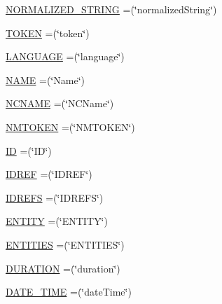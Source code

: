 \begin{DoxyCompactItemize}
\item 
\hyperlink{enumorg_1_1semanticweb_1_1owlapi_1_1vocab_1_1_x_s_d_vocabulary_ae575de1015474d1af2b4d68b3b860fc9}{N\-O\-R\-M\-A\-L\-I\-Z\-E\-D\-\_\-\-S\-T\-R\-I\-N\-G} =(\char`\"{}normalized\-String\char`\"{})
\item 
\hyperlink{enumorg_1_1semanticweb_1_1owlapi_1_1vocab_1_1_x_s_d_vocabulary_ab7d2aaa2bcc22a2cf82afee863ff6a35}{T\-O\-K\-E\-N} =(\char`\"{}token\char`\"{})
\item 
\hyperlink{enumorg_1_1semanticweb_1_1owlapi_1_1vocab_1_1_x_s_d_vocabulary_a97caa0a9ecc52d652717cc24430c829c}{L\-A\-N\-G\-U\-A\-G\-E} =(\char`\"{}language\char`\"{})
\item 
\hyperlink{enumorg_1_1semanticweb_1_1owlapi_1_1vocab_1_1_x_s_d_vocabulary_a34846eda7ef12a87485e47e445bee899}{N\-A\-M\-E} =(\char`\"{}Name\char`\"{})
\item 
\hyperlink{enumorg_1_1semanticweb_1_1owlapi_1_1vocab_1_1_x_s_d_vocabulary_a809c4d39248eaee8d204aa51e4c04f45}{N\-C\-N\-A\-M\-E} =(\char`\"{}N\-C\-Name\char`\"{})
\item 
\hyperlink{enumorg_1_1semanticweb_1_1owlapi_1_1vocab_1_1_x_s_d_vocabulary_a9ec636a494a00d308f7b76985fba61f9}{N\-M\-T\-O\-K\-E\-N} =(\char`\"{}N\-M\-T\-O\-K\-E\-N\char`\"{})
\item 
\hyperlink{enumorg_1_1semanticweb_1_1owlapi_1_1vocab_1_1_x_s_d_vocabulary_ad8905ce2c9e8f3243bef5eab9e1acd7e}{I\-D} =(\char`\"{}I\-D\char`\"{})
\item 
\hyperlink{enumorg_1_1semanticweb_1_1owlapi_1_1vocab_1_1_x_s_d_vocabulary_a8ff6ca35cc6d1e674f6a53d8dacf25c3}{I\-D\-R\-E\-F} =(\char`\"{}I\-D\-R\-E\-F\char`\"{})
\item 
\hyperlink{enumorg_1_1semanticweb_1_1owlapi_1_1vocab_1_1_x_s_d_vocabulary_a48b5b04cfaa917f8439716f644c5edaa}{I\-D\-R\-E\-F\-S} =(\char`\"{}I\-D\-R\-E\-F\-S\char`\"{})
\item 
\hyperlink{enumorg_1_1semanticweb_1_1owlapi_1_1vocab_1_1_x_s_d_vocabulary_a11b59bf52187c2cf35a885b29e407981}{E\-N\-T\-I\-T\-Y} =(\char`\"{}E\-N\-T\-I\-T\-Y\char`\"{})
\item 
\hyperlink{enumorg_1_1semanticweb_1_1owlapi_1_1vocab_1_1_x_s_d_vocabulary_a43975b81444625777bb1c5ee1663ce71}{E\-N\-T\-I\-T\-I\-E\-S} =(\char`\"{}E\-N\-T\-I\-T\-I\-E\-S\char`\"{})
\item 
\hyperlink{enumorg_1_1semanticweb_1_1owlapi_1_1vocab_1_1_x_s_d_vocabulary_aabb7ccd2165b9d0b86c9ad6e1eebf072}{D\-U\-R\-A\-T\-I\-O\-N} =(\char`\"{}duration\char`\"{})
\item 
\hyperlink{enumorg_1_1semanticweb_1_1owlapi_1_1vocab_1_1_x_s_d_vocabulary_a6790413083cd12d777e8d7ef141eb387}{D\-A\-T\-E\-\_\-\-T\-I\-M\-E} =(\char`\"{}date\-Time\char`\"{})

\end{DoxyCompactItemize}
